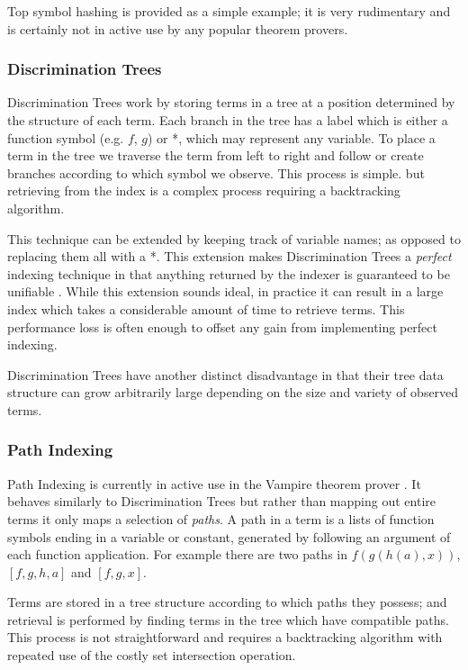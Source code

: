Top symbol hashing is provided as a simple example; it is very rudimentary and
is certainly not in active use by any popular theorem provers.

\subsubsection{Discrimination Trees}

Discrimination Trees work by storing terms in a tree at a position determined by the structure
of each term. Each branch in the tree has a label which is either a function symbol
(e.g. $f$, $g$) or *, which may represent any variable. To place a term in the tree
we traverse the term from left to right and follow or create branches according to
which symbol we observe. This process is simple. but retrieving from the index is a
complex process requiring a backtracking algorithm.

This technique can be extended by keeping track of variable names; as opposed to
replacing them all with a *. This extension makes Discrimination Trees a \emph{perfect} indexing technique in that anything
returned by the indexer is guaranteed to be unifiable \cite{mccune}. While this extension sounds
ideal, in practice it can result in a large index which takes
a considerable amount of time to retrieve terms. This performance
loss is often enough to offset any gain from implementing perfect indexing.

Discrimination Trees have another distinct disadvantage in that their tree data
structure can grow arbitrarily large depending on the size and variety of observed terms.

\subsubsection{Path Indexing}

Path Indexing is currently in active use in the Vampire theorem prover \cite{vampire}.
It behaves similarly to Discrimination Trees but rather than mapping out entire terms
it only maps a selection of \emph{paths}. A path in a term is a lists of function symbols
ending in a variable or constant, generated by following an argument of each function application.
For example there are two paths in $f(g(h(a), x))$, $[f, g, h, a]$ and $[f,g,x]$.

Terms are stored in a tree structure according to which paths they possess; and retrieval
is performed by finding terms in the tree which have compatible paths. This process
is not straightforward and requires a backtracking algorithm with repeated use of
the costly set intersection operation.

